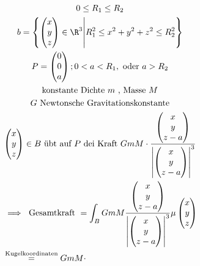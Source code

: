 \begin{bsp*}[note = Gravitation einer Kugelschale]
	\begin{gather*}
		0 \leq R_1 \leq R_2 \\
		b = \left\{ \begin{pmatrix} x \\ y \\ z \end{pmatrix} \in \R^3 \middle| R_1^2 \leq x^2 + y^2 + z^2 \leq R_2^2 \right\} \\
		P = \begin{pmatrix} 0 \\ 0 \\ a \end{pmatrix} ; 0 < a < R_1 , \text{ oder } a > R_2 \\
		\text{konstante Dichte $m$ , Masse $M$} \\
		\text{$G$ Newtonsche Gravitationskonstante} \\
		\begin{pmatrix} x \\ y \\ z \end{pmatrix} \in B \text{ übt auf $P$ dei Kraft } GmM \cdot \frac{\begin{pmatrix} x \\ y \\ z - a \end{pmatrix}}{\abs{\begin{pmatrix} x \\ y \\ z - a \end{pmatrix}}^3} \\
		\begin{split}
			&\implies \text{ Gesamtkraft } = \int_B GmM \frac{\begin{pmatrix} x \\ y \\ z - a \end{pmatrix}}{\abs{\begin{pmatrix} x \\ y \\ z - a \end{pmatrix}}^3} \mu\begin{pmatrix} x \\ y \\ z \end{pmatrix} \\
			&\overset{\text{\scriptsize{Kugelkoordinaten}}}{=} GmM \cdot \\

\end{split}
\end{gather*}
\end{bsp*}
